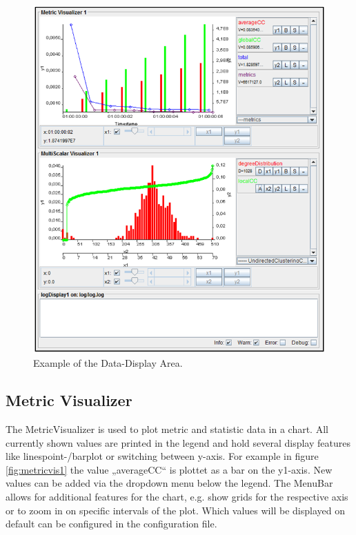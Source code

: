 \begin{figure} [h]
\centering
\includegraphics [scale=0.8] {images/dataarea}
\caption{Example of the Data-Display Area.}
\label{fig:dataarea}
\end{figure}

\subsection{Metric Visualizer}
The MetricVisualizer is used to plot metric and statistic data in a chart. All currently shown values are printed in the legend and hold several display features like linespoint-/barplot or switching between y-axis. For example in figure \ref{fig:metricvis1} the value „averageCC“ is plottet as a bar on the y1-axis. New values can be added via the dropdown menu below the legend. The MenuBar allows for additional features for the chart, e.g. show grids for the respective axis or to zoom in on specific intervals of the plot. Which values will be displayed on default can be configured in the configuration file.

